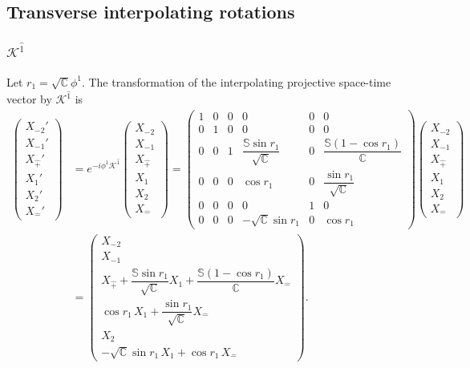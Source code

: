 \documentclass[foundations,article,submit,pdftex,moreauthors]{Definitions/mdpi}
\begin{document}
\subsection{Transverse interpolating rotations}

\subsubsection{\texorpdfstring{$\mathcal{K}^{\hat{1}}$}{K1}}

Let $r_1=\sqrt{\mathbb{C}}\phi^{1}$. The transformation of the interpolating
projective space-time vector by $\mathcal{K}^{\hat{1}}$ is
\begin{align}
\begin{pmatrix}
X_{-2}'\\ X_{-1}'\\ X_{\hat{+}}'\\ X_1'\\ X_2'\\ X_{\hat{-}}'
\end{pmatrix}
&=e^{-i\phi^{1}\mathcal{K}^{\hat{1}}}
\begin{pmatrix}
X_{-2}\\ X_{-1}\\ X_{\hat{+}}\\ X_1\\ X_2\\ X_{\hat{-}}
\end{pmatrix}
=\begin{pmatrix}
1 & 0 & 0 & 0 & 0 & 0\\
0 & 1 & 0 & 0 & 0 & 0\\
0 & 0 & 1 & \dfrac{\mathbb{S}\sin r_1}{\sqrt{\mathbb{C}}} & 0 & \dfrac{\mathbb{S}(1-\cos r_1)}{\mathbb{C}}\\
0 & 0 & 0 & \cos r_1 & 0 & \dfrac{\sin r_1}{\sqrt{\mathbb{C}}}\\
0 & 0 & 0 & 0 & 1 & 0\\
0 & 0 & 0 & -\sqrt{\mathbb{C}}\sin r_1 & 0 & \cos r_1 \label{A108}
\end{pmatrix}
\begin{pmatrix}
X_{-2}\\ X_{-1}\\ X_{\hat{+}}\\ X_1\\ X_2\\ X_{\hat{-}}
\end{pmatrix}\\
&=\begin{pmatrix}
X_{-2}\\ X_{-1}\\
X_{\hat{+}}+\dfrac{\mathbb{S}\sin r_1}{\sqrt{\mathbb{C}}}X_1
+\dfrac{\mathbb{S}(1-\cos r_1)}{\mathbb{C}}X_{\hat{-}}\\
\cos r_1\,X_1+\dfrac{\sin r_1}{\sqrt{\mathbb{C}}}X_{\hat{-}}\\
X_2\\
-\sqrt{\mathbb{C}}\sin r_1\,X_1+\cos r_1\,X_{\hat{-}} 
\end{pmatrix}.
\end{align}
\end{document}
